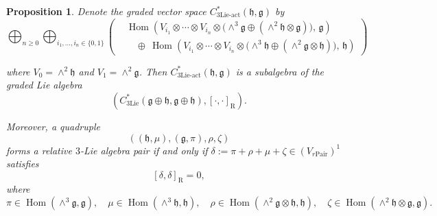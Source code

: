 \documentclass[12pt]{amsart}
\newtheorem{prop}[theorem]{Proposition}
\theoremstyle{definition}
\begin{document}
\begin{prop}
	\label{Prop:subalgebra}
	Denote the graded vector space \( C^*_{\mathrm{3Lie\text{-}act}}(\mathfrak{h}, \mathfrak{g}) \) by
\[
\bigoplus_{n \geq 0} \bigoplus_{i_1, \ldots, i_n \in \{0,1\}} \left(
\begin{aligned}
	&\operatorname{Hom}\left(
	V_{i_1} \otimes \cdots \otimes V_{i_n} \otimes \big( \wedge^3\mathfrak{g} \oplus (\wedge^2\mathfrak{h} \otimes \mathfrak{g}) \big),
	\, \mathfrak{g}
	\right) \\
	&\quad\oplus\
	\operatorname{Hom}\left(
	V_{i_1} \otimes \cdots \otimes V_{i_n} \otimes \big( \wedge^3\mathfrak{h} \oplus (\wedge^2\mathfrak{g} \otimes \mathfrak{h}) \big),
	\, \mathfrak{h}
	\right)
\end{aligned}
\right)
\]

	where \( V_0 = \wedge^2 \mathfrak{h} \) and \( V_1 = \wedge^2 \mathfrak{g} \). Then \( C^*_{\mathrm{3Lie\text{-}act}}(\mathfrak{h}, \mathfrak{g}) \) is a subalgebra of the graded Lie algebra
	\[
	\left( C^*_{\mathrm{3Lie}}(\mathfrak{g} \oplus \mathfrak{h}, \mathfrak{g} \oplus \mathfrak{h}), [\cdot, \cdot]_{\mathrm{R}} \right).
	\]
	
	Moreover, a quadruple
	\[
	\left( \left(\mathfrak{h}, \mu\right), \left(\mathfrak{g}, \pi\right), \rho, \zeta \right)
	\]
	forms a  relative \(3\)-Lie algebra pair  if and only if \( \delta := \pi + \rho + \mu + \zeta \in (V_{r\mathrm{Pair}})^1 \) satisfies
	\[
	[\delta, \delta]_{\mathrm{R}} = 0,
	\]
	where
	\[
	\pi \in \operatorname{Hom}(\wedge^3 \mathfrak{g}, \mathfrak{g}), \quad
	\mu \in \operatorname{Hom}(\wedge^3 \mathfrak{h}, \mathfrak{h}), \quad
	\rho \in \operatorname{Hom}(\wedge^2 \mathfrak{g} \otimes \mathfrak{h}, \mathfrak{h}), \quad
	\zeta \in \operatorname{Hom}(\wedge^2 \mathfrak{h} \otimes \mathfrak{g}, \mathfrak{g}).
	\]
\end{prop}
\end{document}
